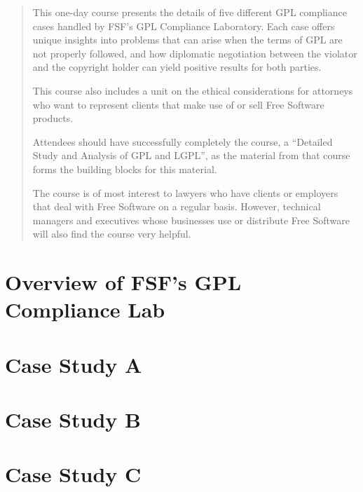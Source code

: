 \documentclass[12pt]{report}
\begin{document}
\begin{abstract}


This one-day course presents the details of five different GPL compliance
cases handled by FSF's GPL Compliance Laboratory.  Each case offers unique
insights into problems that can arise when the terms of GPL are not
properly followed, and how diplomatic negotiation between the violator and
the copyright holder can yield positive results for both parties.

This course also includes a unit on the ethical considerations for
attorneys who want to represent clients that make use of or sell Free
Software products.

Attendees should have successfully completely the course, a ``Detailed
Study and Analysis of GPL and LGPL'', as the material from that course
forms the building blocks for this material.

The course is of most interest to lawyers who have clients or employers
that deal with Free Software on a regular basis.  However, technical
managers and executives whose businesses use or distribute Free Software
will also find the course very helpful.

\end{abstract}

\tableofcontents

\pagebreak


\chapter{Overview of FSF's GPL Compliance Lab}

\chapter{Case Study A}

\chapter{Case Study B}

\chapter{Case Study C}
\end{document}
